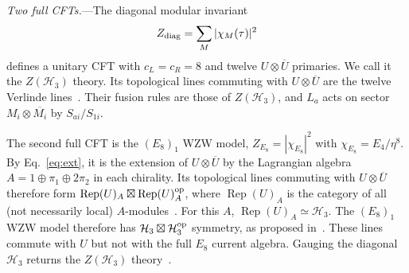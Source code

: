 \documentclass[aps,prl,twocolumn,superscriptaddress,nofootinbib]{revtex4-2}
\newcommand{\cH}{\mathcal H}
\newcommand{\Rep}{\operatorname{Rep}}
\begin{document}
\textit{Two full CFTs.}---The diagonal modular invariant
\begin{equation}
 Z_{\rm diag}=\sum_{M}|\chi_M(\tau)|^2
 \label{eq:Zdiag}
\end{equation}
defines a unitary CFT with $c_L=c_R=8$ and twelve
$U\otimes\overline U$ primaries. We call it the $Z(\cH_3)$ theory. Its
topological lines commuting with $U\otimes\overline U$ are the twelve
Verlinde lines~\cite{Verlinde,PZ}. Their fusion rules are those of
$Z(\cH_3)$, and $L_a$ acts on sector $M_i\otimes\overline{M_i}$ by
$S_{ai}/S_{1i}$.

The second full CFT is the $(E_8)_1$ WZW model,
$Z_{E_8}=|\chi_{E_8}|^2$ with $\chi_{E_8}=E_4/\eta^8$. By
Eq.~\eqref{eq:ext}, it is the extension of $U\otimes\overline U$ by the
Lagrangian algebra $A=1\oplus\pi_1\oplus2\pi_2$ in each chirality. Its
topological lines commuting with $U\otimes\overline U$ therefore form
$\Rep(U)_A\boxtimes\Rep(U)_A^{\rm op}$, where $\Rep(U)_A$ is the
category of all (not necessarily local) $A$-modules~\cite{FRS,DMNO}. For
this $A$, $\Rep(U)_A\simeq\cH_3$. The $(E_8)_1$ WZW model therefore has
$\cH_3\boxtimes\cH_3^{\rm op}$ symmetry, as proposed
in~\cite{AHKZ}. These lines commute with $U$ but not with the full
$E_8$ current algebra. Gauging the diagonal $\cH_3$ returns the
$Z(\cH_3)$ theory~\cite{AHKZ}.
\end{document}
